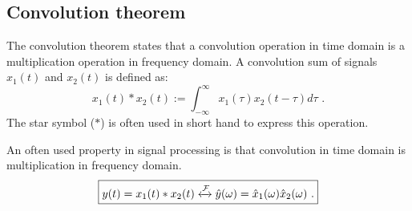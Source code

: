 \subsection{Convolution theorem}
The convolution theorem states that a convolution operation in time domain is a multiplication operation in frequency domain. A convolution sum of signals $x_1(t)$ and $x_2(t)$ is defined as:
\begin{equation}
\boxed{
x_1(t)*x_2(t) := \int_{-\infty}^{\infty} x_1(\tau) x_2(t-\tau)d\tau\,\,.
}
\end{equation}
The star symbol ($*$) is often used in short hand to express this operation.

An often used property in signal processing is that convolution in time domain is multiplication in frequency domain.
\begin{equation}
\boxed{
y(t) =
x_1(t)*x_2(t) \xleftrightarrow{\mathcal{F}} \hat{y}(\omega)=\hat{x}_1(\omega)\hat{x}_2(\omega)\,\,.
}
\end{equation}



